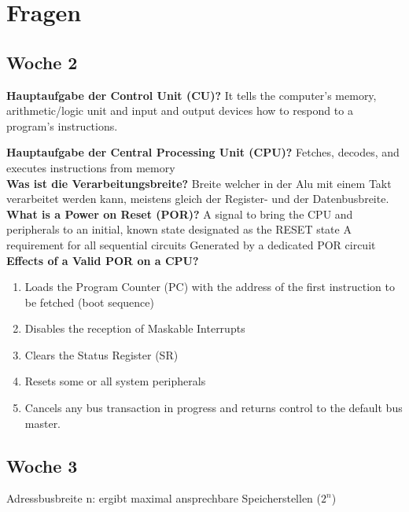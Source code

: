 \section{Fragen}
\subsection*{Woche 2}
\textbf{Hauptaufgabe der Control Unit (CU)?} \newline
It tells the computer's memory, arithmetic/logic unit and input and output devices how to respond to a program's instructions.\newline


\textbf{Hauptaufgabe der Central Processing Unit (CPU)?} \newline
    Fetches, decodes, and executes instructions from memory\\
 
\textbf{Was ist die Verarbeitungsbreite?}\newline
    Breite welcher in der Alu mit einem Takt verarbeitet werden kann, meistens gleich der Register- und der Datenbusbreite.\\
    
\textbf{What is a Power on Reset (POR)?}\newline
    A signal to bring the CPU and peripherals to an initial, known state designated as the RESET state\newline
    A requirement for all sequential circuits\newline
    Generated by a dedicated POR circuit\\

\textbf{Effects of a Valid POR on a CPU?}
\begin{enumerate}
    \item Loads the Program Counter (PC) with the address of the first  instruction to be fetched (boot sequence)
    \item Disables the reception of Maskable Interrupts
    \item Clears the Status Register (SR)
    \item Resets some or all system peripherals
    \item Cancels any bus transaction in progress and returns control to the default bus master.
\end{enumerate}

\subsection*{Woche 3}
Adressbusbreite n: ergibt maximal ansprechbare Speicherstellen ($2^n$)\newline
    
